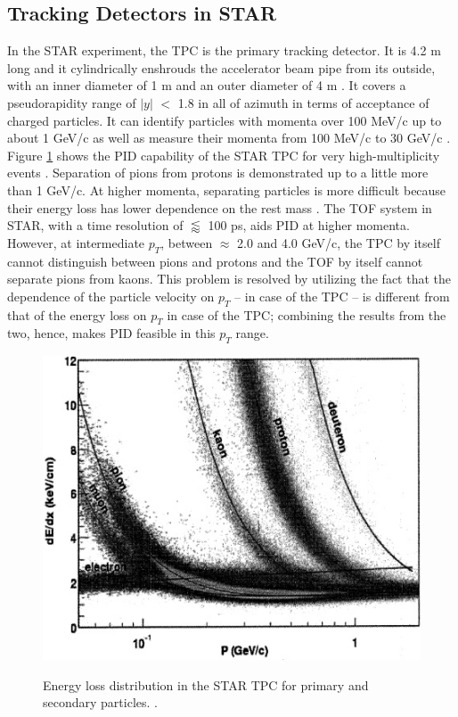 \subsection{Tracking Detectors in STAR}\label{subsec:tracking_STAR}
In the STAR experiment, the TPC is the primary tracking detector. It is 4.2 m long and it cylindrically enshrouds the accelerator beam pipe from its outside, with an inner diameter of 1 m and an outer diameter of 4 m \cite{phdthesisnattrass}. It covers a pseudorapidity range of $|y|$ $<$ 1.8 in all of azimuth in terms of acceptance of charged particles. It can identify particles with momenta over 100 MeV/c up to about 1 GeV/c as well as measure their momenta from 100 MeV/c to 30 GeV/c \cite{Anderson:2003ur}. Figure \ref{fig:STAR_PID} shows the PID capability of the STAR TPC for very high-multiplicity events \cite{0034-4885-73-11-116201}. Separation of pions from protons is demonstrated up to a little more than 1 GeV/c. At higher momenta, separating particles is more difficult because their energy loss has lower dependence on the rest mass \cite{Anderson:2003ur}. The TOF system in STAR, with a time resolution of $\lessapprox$ 100 ps, aids PID at higher momenta. However, at intermediate $p_{T}$, between $\approx$ 2.0 and 4.0 GeV/c, the TPC by itself cannot distinguish between pions and protons and the TOF by itself cannot separate pions from kaons. This problem is resolved by utilizing the fact that the dependence of the particle velocity on $p_{T}$ -- in case of the TPC -- is different from that of the energy loss on $p_{T}$ in case of the TPC; combining the results from the two, hence, makes PID feasible in this $p_{T}$ range. \cite{Shao:2005iu}
\begin{figure}[h]
  \centering
  \includegraphics[width=5.5in]{../figures/0034-4885-73-11-116201_star_PID.jpg}\\
  \caption{Energy loss distribution in the STAR TPC for primary and secondary particles. \cite{0034-4885-73-11-116201}.}\label{fig:STAR_PID}
\end{figure}
